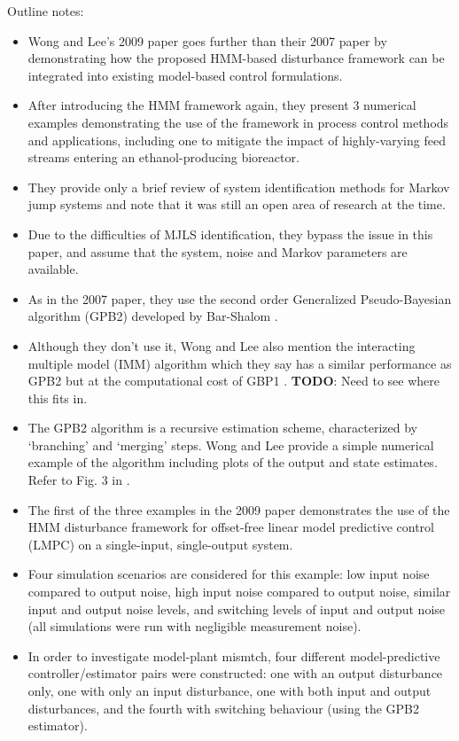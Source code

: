 Outline notes:

\begin{itemize}
	\item Wong and Lee's 2009 paper \cite{wong_realistic_2009} goes further than their 2007 paper \cite{wong_disturbance_2007} by demonstrating how the proposed HMM-based disturbance framework can be integrated into existing model-based control formulations.
	\item After introducing the HMM framework again, they present 3 numerical examples demonstrating the use of the framework in process control methods and applications, including one to mitigate the impact of highly-varying feed streams entering an ethanol-producing bioreactor.
	\item They provide only a brief review of system identification methods for Markov jump systems and note that it was still an open area of research at the time.
	\item Due to the difficulties of MJLS identification, they bypass the issue in this paper, and assume that the system, noise and Markov parameters are available.
	\item As in the 2007 paper, they use the second order Generalized Pseudo-Bayesian algorithm (GPB2) developed by Bar-Shalom \cite{bar-shalom_estimation_1993}.
	\item Although they don't use it, Wong and Lee also mention the interacting multiple model (IMM) algorithm which they say has a similar performance as GPB2 but at the computational cost of GBP1 \cite{wong_realistic_2009}. \textbf{TODO}: Need to see where this fits in.
	\item The GPB2 algorithm is a recursive estimation scheme, characterized by `branching' and `merging' steps. Wong and Lee provide a simple numerical example of the algorithm including plots of the output and state estimates. Refer to Fig. 3 in \cite{wong_realistic_2009}.
	\item The first of the three examples in the 2009 paper demonstrates the use of the HMM disturbance framework for offset-free linear model predictive control (LMPC) on a single-input, single-output system.
	\item Four simulation scenarios are considered for this example: low input noise compared to output noise, high input noise compared to output noise, similar input and output noise levels, and switching levels of input and output noise (all simulations were run with negligible measurement noise).
	\item In order to investigate model-plant mismtch, four different model-predictive controller/estimator pairs were constructed: one with an output disturbance only, one with only an input disturbance, one with both input and output disturbances, and the fourth with switching behaviour (using the GPB2 estimator).

\end{itemize}
